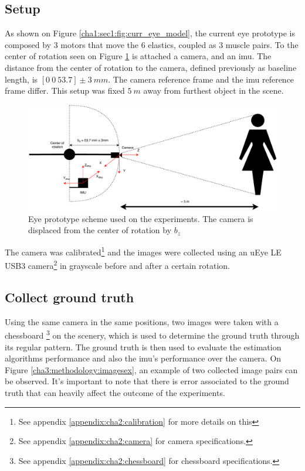 \subsection{Setup}
As shown on Figure \ref{cha1:sec1:fig:curr_eye_model}, the current eye prototype is composed by 3 motors that move the 6 elastics, coupled as 3 muscle pairs. To the center of rotation seen on Figure \ref{cha4:sec3:eyescheme} is attached a camera, and an \acrshort{imu}. The distance from the center of rotation to the camera, defined previously as baseline length, is $[0 \ 0 \ 53.7] \pm 3 \ mm $. The camera reference frame and the \acrshort{imu} reference frame differ. 
This setup was fixed $5 \ m$ away from furthest object in the scene.
\begin{figure}[ht]
	\centering
	\includegraphics[width=\textwidth]{images/eyescheme.pdf}
	\caption[Eye prototype scheme used on the experiments]{Eye prototype scheme used on the experiments. The camera is displaced from the center of rotation by $b_z$ }
	\label{cha4:sec3:eyescheme}
\end{figure}

The camera was calibrated\footnote{See appendix \ref{appendix:cha2:calibration} for more details on this} and the images were collected using an uEye LE USB3 camera\footnote{See appendix \ref{appendix:cha2:camera} for camera specifications.} in grayscale before and after a certain rotation.

\subsection{Collect ground truth}
\label{rnfrfref}
Using the same camera in the same positions, two images were taken with a chessboard \footnote{See appendix \ref{appendix:cha2:chessboard} for chessboard specifications.} on the scenery, which is used to determine the ground truth through its regular pattern. The ground truth is then used to evaluate the estimation algorithms performance and also the \acrshort{imu}'s performance over the camera. On Figure \ref{cha3:methodology:imagesex}, an example of two collected image pairs can be observed. It's important to note that there is error associated to the ground truth that can heavily affect the outcome of the experiments.
	

